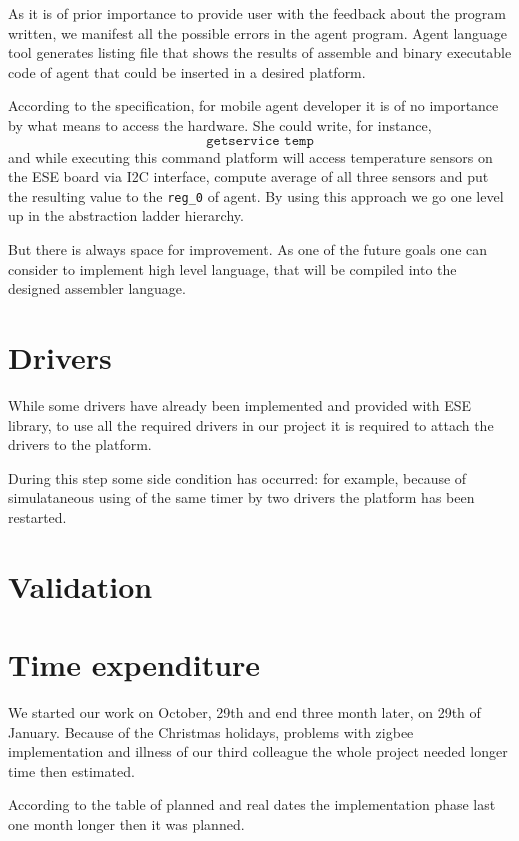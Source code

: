 \documentclass{scrreprt}
\begin{document}
As it is of prior importance to provide user with the feedback about the 
program written, we manifest all the possible errors in the agent program.
Agent language tool generates listing file that shows the results of assemble and 
binary executable code of agent that could be inserted in a desired platform.

According to the specification, for mobile agent developer it is of no importance
by what means to access the hardware. She could write, for instance,
\[
\texttt{getservice temp}
\]
and while executing this command platform will access temperature
sensors on the ESE board via I2C interface, compute average of all three sensors and 
put the resulting value to the \texttt{reg_0} of agent.
By using this approach we go one level up in the abstraction ladder hierarchy.


But there is always space for improvement. As one of the future goals one 
can consider to implement high level language, that will be compiled 
into the designed assembler language.

\section{Drivers}

While some drivers have already been implemented and provided with ESE library,
to use all the required drivers in our project it is required to attach 
the drivers to the platform.

During this step some side condition has occurred:
for example, because of simulataneous using of the same
timer by two drivers the platform has been restarted.


\section{Validation}

\section{Time expenditure}

We started our work on October, 29th and end three month later, on 29th of January.
Because of the Christmas holidays, problems with zigbee implementation and illness of 
our third colleague
the whole project needed longer time then estimated.

According to the table of planned and real dates the implementation phase
last one month longer then it was planned.
\end{document}
